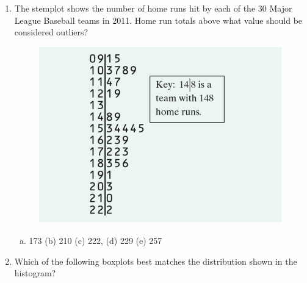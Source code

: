 \documentclass[a4paper,12pt,twoside]{book}
\begin{document}
\begin{itemize}
\begin{enumerate}
   \item The stemplot shows the number of home runs hit by each of the 30 Major League Baseball teams in 2011. Home run totals above what value should be considered outliers?
   
   \begin{figure}[H]
     \centering
     \includegraphics[scale=0.6]{figure3.png}
   \end{figure}
     
  \begin{enumerate}[(a), start = 1]
  \item 173 \hspace{0.6cm} (b) 210 \hspace{0.6cm} (c) 222, \hspace{0.6cm} (d) 229  \hspace{0.6cm} (e) 257
  \end{enumerate}
     \vspace{0.3cm}
     
     \item Which of the following boxplots best matches the distribution shown in the histogram? 
     

\end{enumerate}
\end{itemize}
\end{document}
